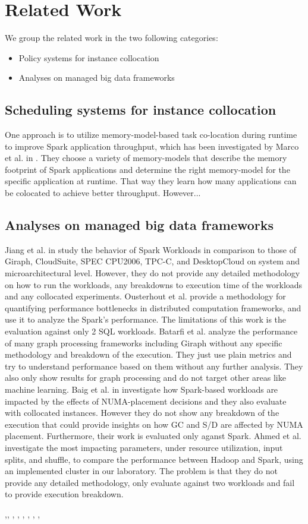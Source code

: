 \section{Related Work}

We group the related work in the two following categories:
\begin{itemize}
\item{Policy systems for instance collocation}
\item{Analyses on managed big data frameworks}
\end{itemize}

\subsection{Scheduling systems for instance collocation}
One approach is to utilize memory-model-based task
co-location during runtime to improve Spark application throughput, which has been
investigated by Marco et al. in \cite{Colocation}. They choose a variety of memory-models
that describe the memory footprint of Spark applications and determine the right memory-model
for the specific application at runtime. That way they learn how many applications can be colocated
to achieve better throughput. However...

\subsection{Analyses on managed big data frameworks}

Jiang et al. in \cite{inmem} study the behavior of Spark Workloads in comparison to those of Giraph, CloudSuite, SPEC CPU2006,
TPC-C, and DesktopCloud on system and microarchitectural level. However, they do not provide any detailed methodology on how to 
run the workloads, any breakdowns to execution time of the workloads and any collocated experiments. Ousterhout et al. \cite{makingsense} provide a methodology for quantifying performance bottlenecks in distributed computation frameworks, and use it to analyze the Spark’s performance. The limitations of this work is the evaluation against only 2 SQL workloads. Batarfi et al. \cite{giraphgraphalytics} analyze the performance of many graph processing frameworks including Giraph without any specific methodology and breakdown of the execution. They just use plain metrics and try to understand performance based on them without any further analysis. They also only show results for graph processing and do not target other areas like machine learning. Baig et al. in \cite{NUMA} investigate how Spark-based workloads are impacted
by the effects of NUMA-placement decisions and they also evaluate with collocated instances. However they do not show any breakdown of the execution that could provide insights on how GC and S/D are affected by NUMA placement. Furthermore, their work is evaluated only aganst Spark. Ahmed et al. \cite{hibench} investigate the most impacting parameters, under resource utilization, input splits, and shuffle, to compare the performance between Hadoop and Spark, using an implemented cluster in our laboratory. The problem is that they do not provide any detailed methodology, only evaluate against two workloads and fail to provide execution breakdown.

\cite{CoLoc},\cite{SLA}, \cite{Hadoop-based}, \cite{splitserve}, \cite{Alibaba1}, \cite{Alibabacolocated}, \cite{Alibabacloud}, \cite{Alibabatrace}, \cite{interference}
